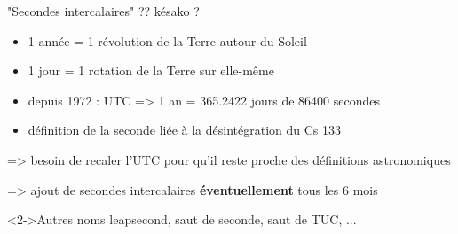 \documentclass[]{beamer}
\begin{document}
\begin{frame}[fragile]{"Secondes intercalaires" ?? késako ?}
    \begin{center}
        \begin{itemize}
            \item 1 année = 1 révolution de la Terre autour du Soleil
            \item 1 jour = 1 rotation de la Terre sur elle-même
            \item depuis 1972 : UTC => 1 an = 365.2422 jours de 86400
                secondes
            \item définition de la seconde liée à la désintégration du Cs 133
        \end{itemize}
    \end{center}
        => besoin de recaler l'UTC pour qu'il reste proche des définitions
        astronomiques

        => ajout de secondes intercalaires \textbf{éventuellement} tous les 6
        mois
    \begin{block}<2->{Autres noms}
        leapsecond, saut de seconde, saut de TUC, ...
    \end{block}
\end{frame}
\end{document}
